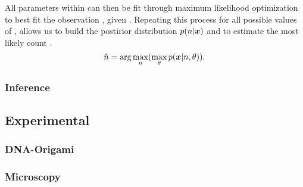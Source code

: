 All parameters within \parameters can then be fit through 
maximum likelihood optimization to best fit the observation \trace, given \n. 
%
Repeating this process for all possible values of \n, allows us to build 
the postirior distribution $p(n | \bm{x})$ and to estimate 
the most likely count \estimatedn.
%
\begin{equation}
    \hat{n} =
    \text{arg}\max_{n}(
    \max_\theta
    p(\bm{x}|n,\theta))
  \text{.}
  \label{eq:method:optimization}
\end{equation}

\subsubsection{Inference}



\subsection{Experimental}
\subsubsection{DNA-Origami}


\subsubsection{Microscopy}


